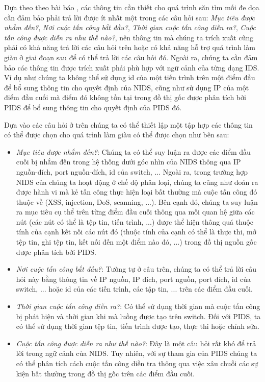 Dựa theo theo bài báo \cite{gunter2018practical}, các thông tin cần thiết cho quá trình săn tìm mối đe dọa cần đảm bảo phải trả lời được ít nhất một trong các câu hỏi sau: \textit{Mục tiêu được nhắm đến?}, \textit{Nơi cuộc tấn công bắt đầu?}, \textit{Thời gian cuộc tấn công diễn ra?}, \textit{Cuộc tấn công được diễn ra như thế nào?}, nên thông tin mà chúng ta trích xuất cũng phải có khả năng trả lời các câu hỏi trên hoặc có khả năng hỗ trợ quá trình làm giàu ở giai đoạn sau để có thể trả lời các câu hỏi đó. Ngoài ra, chúng ta cần đảm bảo các thông tin được trích xuất phải phù hợp với ngữ cảnh của từng dạng IDS. Ví dụ như chúng ta không thể sử dụng id của một tiến trình trên một điểm đầu để bổ sung thông tin cho quyết định của NIDS, cũng như sử dụng IP của một điểm đầu cuối mà điểm đó không tồn tại trong đồ thị gốc được phân tích bởi PIDS để bổ sung thông tin cho quyết định của PIDS đó.

\bigbreak\noindent
Dựa vào các câu hỏi ở trên chúng ta có thể thiết lập một tập hợp các thông tin có thể được chọn cho quá trình làm giàu có thể được chọn như bên sau:

\begin{itemize}
    \item \textit{Mục tiêu được nhắm đến?}: Chúng ta có thể suy luận ra được các điểm đầu cuối bị nhắm đến trong hệ thống dưới góc nhìn của NIDS thông qua IP nguồn-đích, port nguồn-đích, id của switch, ... Ngoài ra, trong trường hợp NIDS của chúng ta hoạt động ở chế độ phân loại, chúng ta cũng như đoán ra được hành vi mà kẻ tấn công thực hiện loại bất thường mà cuộc tấn công đó thuộc về (XSS, injection, DoS, scanning, ...). Bên cạnh đó, chúng ta suy luận ra mục tiêu cụ thể trên từng điểm đầu cuối thông qua mối quan hệ giữa các nút (các nút có thể là tệp tin, tiến trình, ...) được thể hiện thông quá thuộc tính của cạnh kết nối các nút đó (thuộc tính của cạnh có thể là thực thi, mở tệp tin, ghi tệp tin, kết nối đến một điểm nào đó, ...) trong đồ thị nguồn gốc được phân tích bởi PIDS.
    \item \textit{Nơi cuộc tấn công bắt đầu?}: Tường tự ở câu trên, chúng ta có thể trả lời câu hỏi này bằng thông tin về IP nguồn, IP đích, port nguồn, port đích, id của switch, ... hoặc id của các tiến trình, các tập tin, ... trên các điểm đầu cuối.
    \item \textit{Thời gian cuộc tấn công diễn ra?}: Có thể sử dụng thời gian mà cuộc tấn công bị phát hiện và thời gian khi mà luồng được tạo trên switch. Đối với PIDS, ta có thể sử dụng thời gian tệp tin, tiến trình được tạo, thực thi hoặc chỉnh sửa.
    \item \textit{Cuộc tấn công được diễn ra như thế nào?}: Đây là một câu hỏi rất khó để trả lời trong ngữ cảnh của NIDS. Tuy nhiên, với sự tham gia của PIDS chúng ta có thể phân tích cách cuộc tấn công diễn tra thông qua việc xâu chuỗi các sự kiện bất thường trong đồ thị gốc trên các điểm đầu cuối.
\end{itemize}

